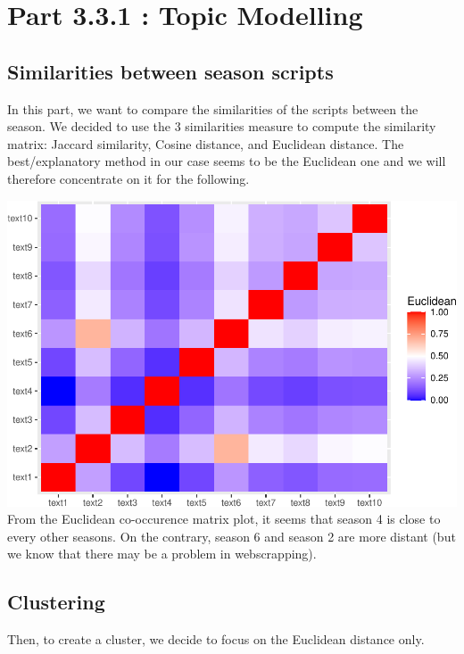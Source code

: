 \documentclass[
]{article}
\begin{document}
\hypertarget{part-3.3.1-topic-modelling}{%
\section{Part 3.3.1 : Topic
Modelling}\label{part-3.3.1-topic-modelling}}

\hypertarget{similarities-between-season-scripts}{%
\subsection{Similarities between season
scripts}\label{similarities-between-season-scripts}}

In this part, we want to compare the similarities of the scripts between
the season. We decided to use the 3 similarities measure to compute the
similarity matrix: Jaccard similarity, Cosine distance, and Euclidean
distance. The best/explanatory method in our case seems to be the
Euclidean one and we will therefore concentrate on it for the following.

\includegraphics{report_files/figure-latex/unnamed-chunk-51-1.pdf} From
the Euclidean co-occurence matrix plot, it seems that season 4 is close
to every other seasons. On the contrary, season 6 and season 2 are more
distant (but we know that there may be a problem in webscrapping).

\hypertarget{clustering}{%
\subsection{Clustering}\label{clustering}}

Then, to create a cluster, we decide to focus on the Euclidean distance
only.
\end{document}
